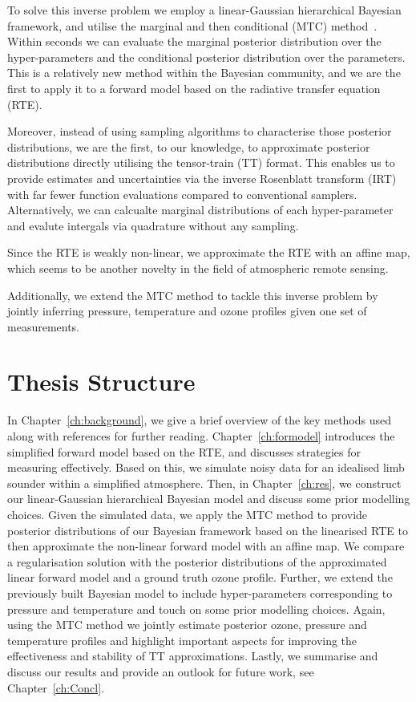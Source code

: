 To solve this inverse problem we employ a linear-Gaussian hierarchical Bayesian framework, and utilise the marginal and then conditional (MTC) method~\cite{fox2016fast}.
Within seconds we can evaluate the marginal posterior distribution over the hyper-parameters and the conditional posterior distribution over the parameters.
This is a relatively new method within the Bayesian community, and we are the first to apply it to a forward model based on the radiative transfer equation (RTE).

Moreover, instead of using sampling algorithms to characterise those posterior distributions, we are the first, to our knowledge, to approximate posterior distributions directly utilising the tensor-train (TT) format.
This enables us to provide estimates and uncertainties via the inverse Rosenblatt transform (IRT) with far fewer function evaluations compared to conventional samplers.
Alternatively, we can calcualte marginal distributions of each hyper-parameter and evalute intergals via quadrature without any sampling.

Since the RTE is weakly non-linear, we approximate the RTE with an affine map, which seems to be another novelty in the field of atmospheric remote sensing.

Additionally, we extend the MTC method to tackle this inverse problem by jointly inferring pressure, temperature and ozone profiles given one set of measurements.


\section{Thesis Structure}
In Chapter~\ref{ch:background}, we give a brief overview of the key methods used along with references for further reading.
Chapter~\ref{ch:formodel} introduces the simplified forward model based on the RTE, and discusses strategies for measuring effectively.
Based on this, we simulate noisy data for an idealised limb sounder within a simplified atmosphere.
Then, in Chapter~\ref{ch:res}, we construct our linear-Gaussian hierarchical Bayesian model and discuss some prior modelling choices.
Given the simulated data, we apply the MTC method to provide posterior distributions of our Bayesian framework based on the linearised RTE to then approximate the non-linear forward model with an affine map. 
We compare a regularisation solution with the posterior distributions of the approximated linear forward model and a ground truth ozone profile.
Further, we extend the previously built Bayesian model to include hyper-parameters corresponding to pressure and temperature and touch on some prior modelling choices. 
Again, using the MTC method we jointly estimate posterior ozone, pressure and temperature profiles and highlight important aspects for improving the effectiveness and stability of TT approximations.
Lastly, we summarise and discuss our results and provide an outlook for future work, see Chapter~\ref{ch:Concl}.

